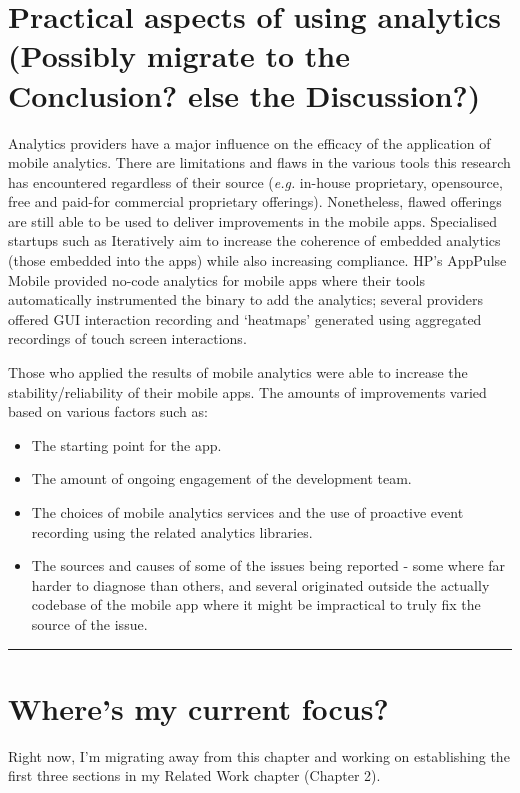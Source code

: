 \clearpage
\section[Practical aspects of using analytics]{Practical aspects of using analytics \\ \small{(Possibly migrate to the Conclusion? else the Discussion?)}}
Analytics providers have a major influence on the efficacy of the application of mobile analytics. There are limitations and flaws in the various tools this research has encountered regardless of their source (\emph{e.g.} in-house proprietary, opensource, free and paid-for commercial proprietary offerings). Nonetheless, flawed offerings are still able to be used to deliver improvements in the mobile apps. Specialised startups such as Iteratively aim to increase the coherence of embedded analytics (those embedded into the apps) while also increasing compliance. HP's AppPulse Mobile provided no-code analytics for mobile apps where their tools automatically instrumented the binary to add the analytics; several providers offered GUI interaction recording and `heatmaps' generated using aggregated recordings of touch screen interactions.

Those who applied the results of mobile analytics were able to increase the stability/reliability of their mobile apps. The amounts of improvements varied based on various factors such as:
\begin{itemize}
    \itemsep0em
    \item The starting point for the app.
    \item The amount of ongoing engagement of the development team.
    \item The choices of mobile analytics services and the use of proactive event recording using the related analytics libraries.
    \item The sources and causes of some of the issues being reported - some where far harder to diagnose than others, and several originated outside the actually codebase of the mobile app where it might be impractical to truly fix the source of the issue.
\end{itemize}

\noindent
\rule{\textwidth}{0.4pt}

\clearpage
\section{Where's my current focus?}
Right now, I'm migrating away from this chapter and working on establishing the first three sections in my Related Work chapter (Chapter 2).
